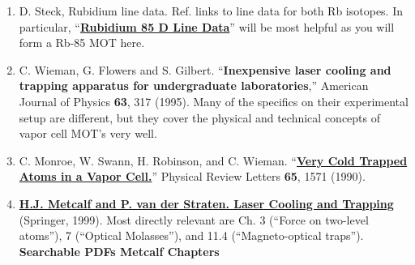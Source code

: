 \documentclass{../lab}
\begin{document}
\begin{enumerate}
    \item D. Steck, Rubidium line data. Ref. \cite{Steck} links to line data for both Rb isotopes. In particular,  ``\href{https://steck.us/alkalidata/rubidium85numbers.pdf}{\textbf{Rubidium 85 D Line Data}}'' will be most helpful as you will form a Rb-85 MOT here. 

    \item C. Wieman, G. Flowers and S. Gilbert. ``\textbf{Inexpensive laser cooling and trapping apparatus for undergraduate laboratories},'' American Journal of Physics \textbf{63}, 317 (1995). Many of the specifics on their experimental setup are different, but they cover the physical and technical concepts of vapor cell MOT's very well.

    \item C. Monroe, W. Swann, H. Robinson, and C. Wieman. ``\href{https://journals.aps.org/prl/pdf/10.1103/PhysRevLett.65.1571}{\textbf{Very Cold Trapped Atoms in a Vapor Cell.}}'' Physical Review Letters \textbf{65}, 1571 (1990). 

    \item \href{http://books.google.com/books?id=hDJPnSFh-g0C&dq=H.J.+Metcalf+and+P.+van+der+Straeten.+Laser+Cooling+and+Trapping+book&printsec=frontcover&source=bn&hl=en&ei=jMWaS4eRD4TuswPgytidAg&sa=X&oi=book\_result&ct=result&resnum=4&ved=0CBAQ6AEwAw#v=onepage&q=&f=false}{\textbf{H.J. Metcalf and P. van der Straten. Laser Cooling and Trapping}} (Springer, 1999). Most directly relevant are Ch. 3 (``Force on two-level atoms''), 7 (``Optical Molasses''), and 11.4 (``Magneto-optical traps''). \textbf{Searchable PDFs Metcalf Chapters}


\end{enumerate}
\end{document}
